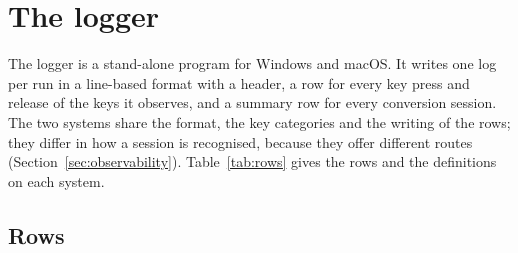 
\section{The logger}
\label{sec:logger}

The logger is a stand-alone program for Windows and macOS. It writes one log per run in a line-based format with a
header, a row for every key press and release of the keys it observes, and a summary row for every conversion
session. The two systems share the format, the key categories and the writing of the rows; they differ in how a
session is recognised, because they offer different routes (Section~\ref{sec:observability}). Table~\ref{tab:rows}
gives the rows and the definitions on each system.

\subsection{Rows}
\label{sec:logger-rows}


